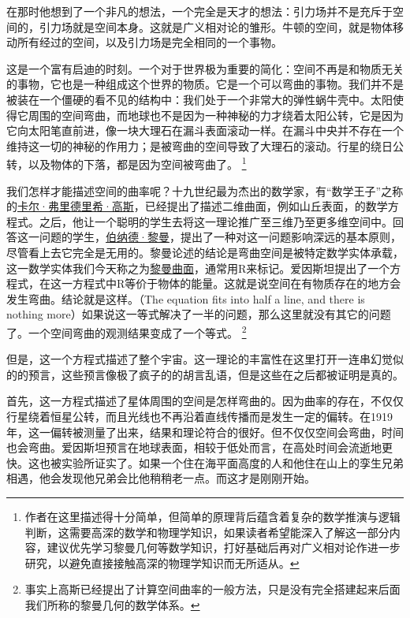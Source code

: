     在那时他想到了一个非凡的想法，一个完全是天才的想法：引力场并不是充斥于空间的，引力场就是空间本身。这就是广义相对论的雏形。牛顿的空间，就是物体移动所有经过的空间，以及引力场是完全相同的一个事物。

    这是一个富有启迪的时刻。一个对于世界极为重要的简化：空间不再是和物质无关的事物，它也是一种组成这个世界的物质。它是一个可以弯曲的事物。我们并不是被装在一个僵硬的看不见的结构中：我们处于一个非常大的弹性蜗牛壳中。太阳使得它周围的空间弯曲，而地球也不是因为一种神秘的力才绕着太阳公转，它是因为它向太阳笔直前进，像一块大理石在漏斗表面滚动一样。在漏斗中央并不存在一个维持这一切的神秘的作用力；是被弯曲的空间导致了大理石的滚动。行星的绕日公转，以及物体的下落，都是因为空间被弯曲了。
\footnote[3]
{
作者在这里描述得十分简单，但简单的原理背后蕴含着复杂的数学推演与逻辑判断，这需要高深的数学和物理学知识，如果读者希望能深入了解这一部分内容，建议优先学习黎曼几何等数学知识，打好基础后再对广义相对论作进一步研究，以避免直接接触高深的物理学知识而无所适从。
}

    我们怎样才能描述空间的曲率呢？十九世纪最为杰出的数学家，有“数学王子”之称的\href{https://en.wikipedia.org/wiki/JJohann Carl Friedrich Gauss}{卡尔·弗里德里希·高斯}，已经提出了描述二维曲面，例如山丘表面，的数学方程式。之后，他让一个聪明的学生去将这一理论推广至三维乃至更多维空间中。回答这一问题的学生，\href{https://en.wikipedia.org/wiki/Georg Friedrich Bernhard Riemann}{伯纳德·黎曼}，提出了一种对这一问题影响深远的基本原则，尽管看上去它完全是无用的。黎曼论述的结论是弯曲空间是被特定数学实体承载，这一数学实体我们今天称之为\href{http://toyhouse.cc/wiki/index.php/黎曼曲面}{黎曼曲面}，通常用R来标记。爱因斯坦提出了一个方程式，在这一方程式中R等价于物体的能量。这就是说空间在有物质存在的地方会发生弯曲。结论就是这样。（The equation fits into half a line, and there is nothing more）如果说这一等式解决了一半的问题，那么这里就没有其它的问题了。一个空间弯曲的观测结果变成了一个等式。
\footnote[4]
{
事实上高斯已经提出了计算空间曲率的一般方法，只是没有完全搭建起来后面我们所称的黎曼几何的数学体系。
}


    但是，这一个方程式描述了整个宇宙。这一理论的丰富性在这里打开一连串幻觉似的的预言，这些预言像极了疯子的的胡言乱语，但是这些在之后都被证明是真的。
 
   首先，这一方程式描述了星体周围的空间是怎样弯曲的。因为曲率的存在，不仅仅行星绕着恒星公转，而且光线也不再沿着直线传播而是发生一定的偏转。在1919年，这一偏转被测量了出来，结果和理论符合的很好。但不仅仅空间会弯曲，时间也会弯曲。爱因斯坦预言在地球表面，相较于低处而言，在高处时间会流逝地更快。这也被实验所证实了。如果一个住在海平面高度的人和他住在山上的孪生兄弟相遇，他会发现他兄弟会比他稍稍老一点。而这才是刚刚开始。

